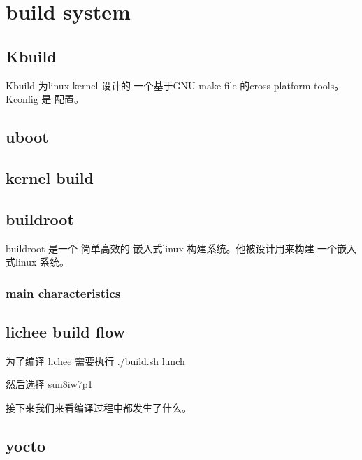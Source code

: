\part{build system}


\chapter{Kbuild}

Kbuild 为linux kernel 设计的  一个基于GNU make file 的cross platform tools。 Kconfig 是
配置。



\chapter{uboot}


\chapter{kernel build }


\chapter{buildroot}

buildroot 是一个 简单高效的 嵌入式linux 构建系统。他被设计用来构建
一个嵌入式linux 系统。

\section{main characteristics}



\chapter{lichee build flow}


为了编译 lichee 需要执行 ./build.sh lunch

然后选择 sun8iw7p1

接下来我们来看编译过程中都发生了什么。









\chapter{yocto}
